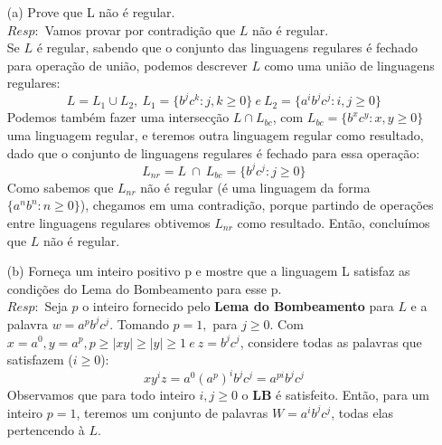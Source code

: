 \documentclass{homework}
\begin{document}
	\begin{itemize}
		\item[(a)] Prove que L não é regular.\\
		$Resp:$ Vamos provar por contradição que $L$ não é regular.\\
			Se $L$ é regular, sabendo que o conjunto das linguagens regulares é fechado para operação de união, podemos descrever $L$ como uma união de linguagens regulares: 
			\[L = L_1 \cup L_2,\ L_1 = \{b^j c^k:j,k \geq 0\}\ e\ L_2 = \{a^i b^j c^j:i,j \geq 0\}\] 
			Podemos também fazer uma intersecção $L \cap L_{bc}$, com $L_{bc} = \{b^x c^y:x,y \geq 0\}$ uma linguagem regular, e teremos outra linguagem regular como resultado, dado que o conjunto de linguagens regulares é fechado para essa operação:
			\[L_{nr} = L\ \cap\ L_{bc} = \{b^j c^j:j \geq 0\}\]
			Como sabemos que $L_{nr}$ não é regular (é uma linguagem da forma $\{a^nb^n:n \geq 0\}$), chegamos em uma contradição, porque partindo de operações entre linguagens regulares obtivemos $L_{nr}$ como resultado. Então, concluímos que $L$ não é regular.
	\end{itemize}
	\begin{itemize}
		\item[(b)] Forneça um inteiro positivo p e mostre que a linguagem L satisfaz
as condições do Lema do Bombeamento para esse p.\\
		$Resp:$ Seja $p$ o inteiro fornecido pelo \textbf{Lema do Bombeamento} para $L$ e a palavra $w = a^pb^jc^j$. Tomando $p = 1,$ para $j \geq 0$. Com $x = a^0, y = a^p, p \geq |xy| \geq |y| \geq 1\ e\ z = b^j c^j$, considere todas as palavras que satisfazem ($i \geq 0$):
			\[xy^iz = a^0(a^{p})^i b^j c^j = a^{pi} b^j c^j\]
		Observamos que para todo inteiro $i,j \geq 0$ o \textbf{LB} é satisfeito. Então, para um inteiro $p = 1$, teremos um conjunto de palavras $W = a^{i} b^j c^j$, todas elas pertencendo à $L$.
	\end{itemize}
\end{document}
